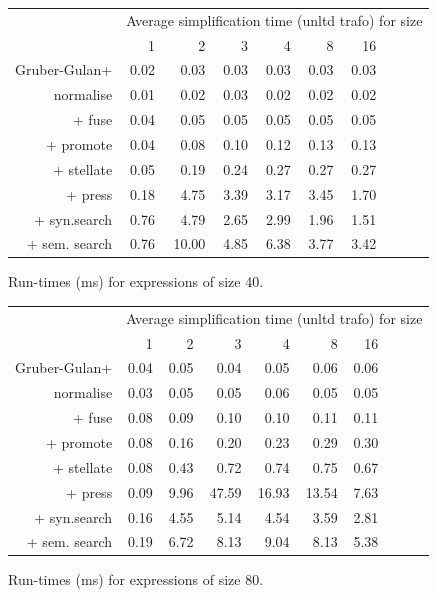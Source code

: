 \begin{figure}\begin{tabular}{rrrrrrrrrr}
 & \multicolumn{9}{c}{Average simplification time (unltd trafo) for size} \\
 & 1 & 2 & 3 & 4 & 8 & 16 \\
Gruber-Gulan+ & 0.02 & 0.03 & 0.03 & 0.03 & 0.03 & 0.03 \\
normalise & 0.01 & 0.02 & 0.03 & 0.02 & 0.02 & 0.02 \\
+ fuse & 0.04 & 0.05 & 0.05 & 0.05 & 0.05 & 0.05 \\
+ promote & 0.04 & 0.08 & 0.10 & 0.12 & 0.13 & 0.13 \\
+ stellate & 0.05 & 0.19 & 0.24 & 0.27 & 0.27 & 0.27 \\
+ press & 0.18 & 4.75 & 3.39 & 3.17 & 3.45 & 1.70 \\
+ syn.search & 0.76 & 4.79 & 2.65 & 2.99 & 1.96 & 1.51 \\
+ sem. search & 0.76 & 10.00 & 4.85 & 6.38 & 3.77 & 3.42 \\
\end{tabular}\caption{Run-times (ms) for expressions of size 40.}\end{figure}
\begin{figure}\begin{tabular}{rrrrrrrrrr}
 & \multicolumn{9}{c}{Average simplification time (unltd trafo) for size} \\
 & 1 & 2 & 3 & 4 & 8 & 16 \\
Gruber-Gulan+ & 0.04 & 0.05 & 0.04 & 0.05 & 0.06 & 0.06 \\
normalise & 0.03 & 0.05 & 0.05 & 0.06 & 0.05 & 0.05 \\
+ fuse & 0.08 & 0.09 & 0.10 & 0.10 & 0.11 & 0.11 \\
+ promote & 0.08 & 0.16 & 0.20 & 0.23 & 0.29 & 0.30 \\
+ stellate & 0.08 & 0.43 & 0.72 & 0.74 & 0.75 & 0.67 \\
+ press & 0.09 & 9.96 & 47.59 & 16.93 & 13.54 & 7.63 \\
+ syn.search & 0.16 & 4.55 & 5.14 & 4.54 & 3.59 & 2.81 \\
+ sem. search & 0.19 & 6.72 & 8.13 & 9.04 & 8.13 & 5.38 \\
\end{tabular}\caption{Run-times (ms) for expressions of size 80.}\end{figure}
